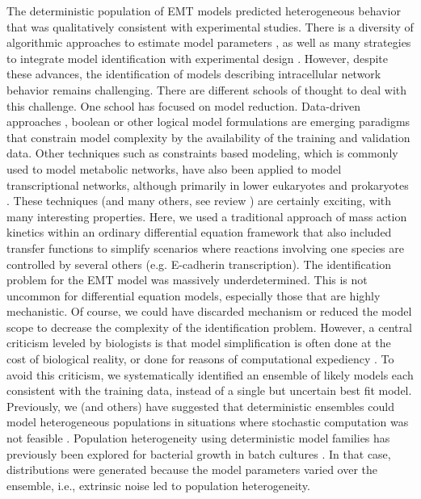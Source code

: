 \documentclass[12pt]{article}
\begin{document}
The deterministic population of EMT models predicted heterogeneous behavior that was qualitatively consistent with experimental studies.
There is a diversity of algorithmic approaches to estimate model parameters \citep{Moles:2003aa}, as well as many strategies to integrate model identification with experimental design \citep{Rodriguez-Fernandez:2013aa,Villaverde:2014aa}.
However, despite these advances, the identification of models describing intracellular network behavior remains challenging.
There are different schools of thought to deal with this challenge.
One school has focused on model reduction.
Data-driven approaches \citep{Cirit:2012kx}, boolean \citep{Choi:2012bs} or other logical model formulations \citep{Morris:2011ys,Terfve:2012kq}
are emerging paradigms that constrain model complexity by the availability of the training and validation data.
Other techniques such as constraints based modeling, which is commonly used to model metabolic networks, have also been applied to model transcriptional networks, although primarily in lower eukaryotes and prokaryotes \citep{Hyduke:2010rt}. These techniques (and many others, see review \citep{Wayman2013}) are certainly exciting, with many interesting properties.
Here, we used a traditional approach of mass action kinetics within an ordinary differential equation framework that also included transfer functions to simplify scenarios where reactions involving one species are controlled by several others (e.g. E-cadherin transcription).
The identification problem for the EMT model was massively underdetermined.
This is not uncommon for differential equation models, especially those that are highly mechanistic.
Of course, we could have discarded mechanism or reduced the model scope to decrease the complexity of the identification problem.
However, a central criticism leveled by biologists is that model simplification is often done at the cost of biological reality, or done for reasons of computational expediency \citep{Sainani2012}.
To avoid this criticism, we systematically identified an ensemble of likely models each consistent with the training data, instead of a single but uncertain best fit model.
Previously, we (and others) have suggested that deterministic ensembles could model heterogeneous populations in situations where stochastic computation was not feasible \citep{Lequieu:2011fj}.
Population heterogeneity using deterministic model families has previously been explored for bacterial growth in batch cultures \citep{Lee:2009fk}.
In that case, distributions were generated because the model parameters varied over the ensemble, i.e., extrinsic noise led to population heterogeneity.
\end{document}
